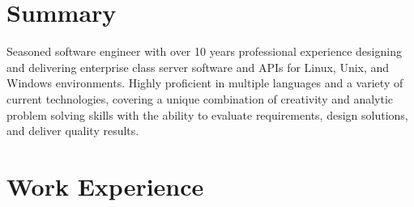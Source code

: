 \documentclass[11pt,letterpaper,roman]{moderncv} %
\begin{document}









\makecvtitle %


\section{Summary}

\cvitem{}
{
Seasoned software engineer with over 10 years professional experience designing and delivering enterprise class server software and APIs for Linux, Unix, and Windows environments.  Highly proficient in multiple languages and a variety of current technologies, covering a unique combination of creativity and analytic problem solving skills with the ability to evaluate requirements, design solutions, and deliver quality results.
}


\section{Work Experience}
\end{document}
